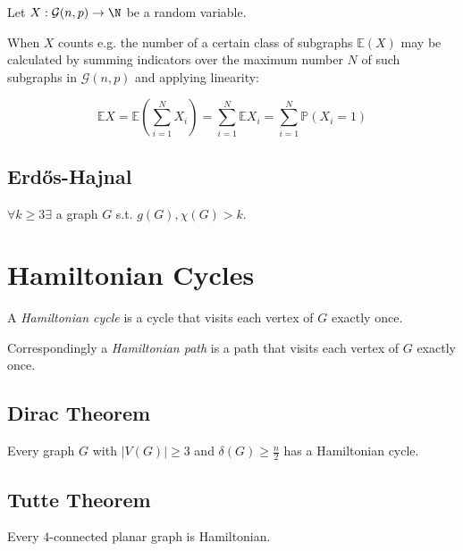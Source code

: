 Let $X : \mathcal{G}(n,p) \to \N$ be a random variable.

When $X$ counts e.g. the number of a certain class of subgraphs $\mathbb{E}(X)$ may be calculated by summing indicators over the maximum number $N$ of such subgraphs in $\mathcal{G}(n,p)$ and applying linearity:

\vspace*{-4mm}
$$\mathbb{E}X = \mathbb{E}\left(\sum_{i=1}^N X_i\right) = \sum_{i=1}^N \mathbb{E}X_i = \sum_{i=1}^N \mathbb{P}(X_i=1)$$

\subsection*{Erd\H{o}s-Hajnal}

$\forall k \geq 3 \exists$ a graph $G$ s.t. $g(G), \chi(G) > k$.

\section*{Hamiltonian Cycles}

A \emph{Hamiltonian cycle} is a cycle that visits each vertex of $G$ exactly once.

Correspondingly a \emph{Hamiltonian path} is a path that visits each vertex of $G$ exactly once.

\subsection*{Dirac Theorem}

Every graph $G$ with $|V(G)| \geq 3$ and $\delta(G) \geq \frac{n}{2}$ has a Hamiltonian cycle.

\subsection*{Tutte Theorem}

Every $4$-connected planar graph is Hamiltonian.
